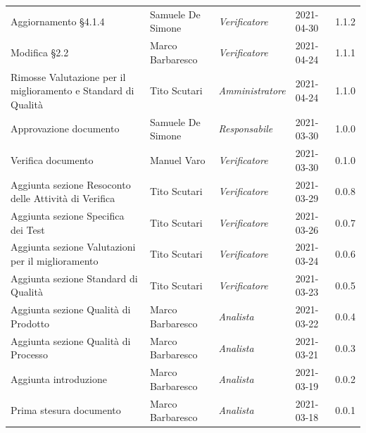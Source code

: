 \documentclass[a4paper]{article}
\begin{document}
\begin{center}
\begin{longtable}[!h]{p{160px} p{80px} p{70px} p{55px} p{40px}}
        Aggiornamento \S 4.1.4                                                                             & Samuele De Simone & \textit{Verificatore}   & 2021-04-30    & 1.1.2             \\
        Modifica \S 2.2                                                                                    & Marco Barbaresco  & \textit{Verificatore}   & 2021-04-24    & 1.1.1             \\
        Rimosse Valutazione per il miglioramento e Standard di Qualità                                     & Tito Scutari      & \textit{Amministratore} & 2021-04-24    & 1.1.0             \\
        Approvazione documento                                                                             & Samuele De Simone & \textit{Responsabile}   & 2021-03-30    & 1.0.0             \\
        Verifica documento                                                                                 & Manuel Varo       & \textit{Verificatore}   & 2021-03-30    & 0.1.0             \\
        Aggiunta sezione Resoconto delle Attività di Verifica                                              & Tito Scutari      & \textit{Verificatore}   & 2021-03-29    & 0.0.8             \\
        Aggiunta sezione Specifica dei Test                                                                & Tito Scutari      & \textit{Verificatore}   & 2021-03-26    & 0.0.7             \\
        Aggiunta sezione Valutazioni per il miglioramento                                                  & Tito Scutari      & \textit{Verificatore}   & 2021-03-24    & 0.0.6             \\
        Aggiunta sezione Standard di Qualità                                                               & Tito Scutari      & \textit{Verificatore}   & 2021-03-23    & 0.0.5             \\
        Aggiunta sezione Qualità di Prodotto                                                               & Marco Barbaresco  & \textit{Analista}       & 2021-03-22    & 0.0.4             \\
        Aggiunta sezione Qualità di Processo                                                               & Marco Barbaresco  & \textit{Analista}       & 2021-03-21    & 0.0.3             \\
        Aggiunta introduzione                                                                              & Marco Barbaresco  & \textit{Analista}       & 2021-03-19    & 0.0.2             \\
        Prima stesura documento                                                                            & Marco Barbaresco  & \textit{Analista}       & 2021-03-18    & 0.0.1             \\
    \end{longtable}
\end{center}
\end{document}

